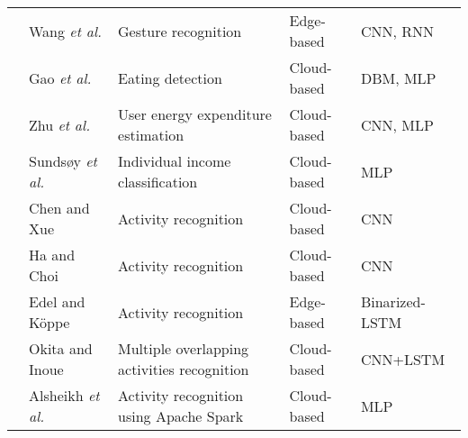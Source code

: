 \documentclass[journal,comsoc,letter]{IEEEtran}
\begin{document}
\begin{table*}[t!]
\begin{tabular}{|c|C{3.5cm}|C{5cm}|C{1.8cm}|C{2.3cm}|}
                                             & Wang \emph{et al.} \cite{wang2016interacting}                 & Gesture recognition                                                           & Edge-based                     & CNN, RNN                 \\  
                                             & Gao \emph{et al.} \cite{gao2016ihear}                         & Eating detection                                                              & Cloud-based                    & DBM, MLP                 \\  
                                             & Zhu \emph{et al.} \cite{zhu2015using}                         & User energy expenditure estimation                                            & Cloud-based                    & CNN, MLP                 \\  
                                             & Sunds{\o}y \emph{et al.} \cite{sundsoy2016deep}               & Individual income classification                                              & Cloud-based                    & MLP                      \\  
                                             & Chen and Xue \cite{chen2015deep}                              & Activity recognition                                                          & Cloud-based                    & CNN                      \\  
                                             & Ha and Choi \cite{ha2016convolutional}                        & Activity recognition                                                          & Cloud-based                    & CNN                      \\  
                                             & Edel and K{\"o}ppe \cite{edel2016binarized}                   & Activity recognition                                                          & Edge-based                     & Binarized-LSTM           \\  
                                             & Okita and Inoue \cite{okita2017recognition}                   & Multiple overlapping activities recognition                                   & Cloud-based                    & CNN+LSTM                 \\  
                                             & Alsheikh \emph{et al.} \cite{alsheikh2016mobile}              & Activity recognition using Apache Spark                                       & Cloud-based                    & MLP                      \\  

\end{tabular}
\end{table*}
\end{document}
